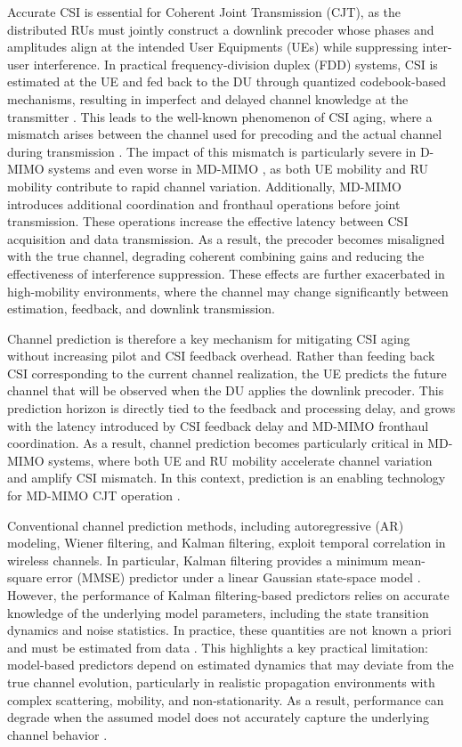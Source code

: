 \documentclass[lettersize,journal]{IEEEtran}
\begin{document}
Accurate CSI is essential for Coherent Joint Transmission (CJT), as the distributed RUs must jointly construct a downlink precoder whose phases and amplitudes align at the intended User Equipments (UEs) while suppressing inter-user interference. 
In practical frequency-division duplex (FDD) systems, CSI is estimated at the UE and fed back to the DU through quantized codebook-based mechanisms, resulting in imperfect and delayed channel knowledge at the transmitter \cite{wiopt}. 
This leads to the well-known phenomenon of CSI aging, where a mismatch arises between the channel used for precoding and the actual channel during transmission \cite{kim_kalman_ml}. 
The impact of this mismatch is particularly severe in D-MIMO systems \cite{channel_aging_hardware_CF, rate_splitting} and even worse in MD-MIMO \cite{kumar_csi_aging}, as both UE mobility and RU mobility contribute to rapid channel variation.
Additionally, MD-MIMO introduces additional coordination and fronthaul operations before joint transmission. 
These operations increase the effective latency between CSI acquisition and data transmission.
As a result, the precoder becomes misaligned with the true channel, degrading coherent combining gains and reducing the effectiveness of interference suppression. 
These effects are further exacerbated in high-mobility environments, where the channel may change significantly between estimation, feedback, and downlink transmission.

Channel prediction is therefore a key mechanism for mitigating CSI aging without increasing pilot and CSI feedback overhead. 
Rather than feeding back CSI corresponding to the current channel realization, the UE predicts the future channel that will be observed when the DU applies the downlink precoder. 
This prediction horizon is directly tied to the feedback and processing delay, and grows with the latency introduced by CSI feedback delay and MD-MIMO fronthaul coordination. 
As a result, channel prediction becomes particularly critical in MD-MIMO systems, where both UE and RU mobility accelerate channel variation and amplify CSI mismatch.
In this context, prediction is an enabling technology for MD-MIMO CJT operation \cite{wiopt, kim_kalman_ml}.

Conventional channel prediction methods, including autoregressive (AR) modeling, Wiener filtering, and Kalman filtering, exploit temporal correlation in wireless channels. 
In particular, Kalman filtering provides a minimum mean-square error (MMSE) predictor under a linear Gaussian state-space model \cite{kim_kalman_ml, ekf}. 
However, the performance of Kalman filtering-based predictors relies on accurate knowledge of the underlying model parameters, including the state transition dynamics and noise statistics. 
In practice, these quantities are not known a priori and must be estimated from data \cite{kim_kalman_ml}. 
This highlights a key practical limitation: model-based predictors depend on estimated dynamics that may deviate from the true channel evolution, particularly in realistic propagation environments with complex scattering, mobility, and non-stationarity. 
As a result, performance can degrade when the assumed model does not accurately capture the underlying channel behavior \cite{lstm_vs_kf, kf_model_mismatch}.
\end{document}

